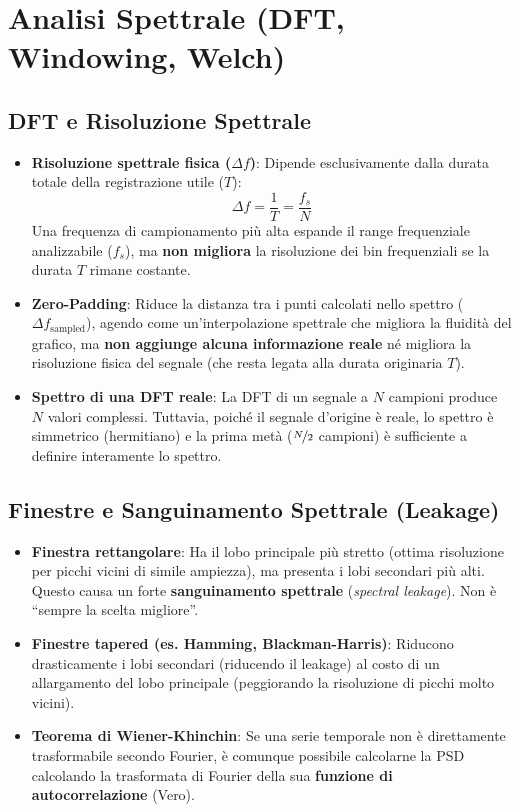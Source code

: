 \documentclass[10pt, letterpaper]{report}
\begin{document}
\chapter{Analisi Spettrale (DFT, Windowing, Welch)}

\section{DFT e Risoluzione Spettrale}
\begin{itemize}
    \item \textbf{Risoluzione spettrale fisica (\(\Delta f\))}: Dipende esclusivamente dalla durata totale della registrazione utile (\(T\)):
    \[
    \Delta f = \frac{1}{T} = \frac{f_s}{N}
    \]
    Una frequenza di campionamento più alta espande il range frequenziale analizzabile (\(f_s\)), ma \textbf{non migliora} la risoluzione dei bin frequenziali se la durata \(T\) rimane costante.
    \item \textbf{Zero-Padding}: Riduce la distanza tra i punti calcolati nello spettro (\(\Delta f_{\text{sampled}}\)), agendo come un'interpolazione spettrale che migliora la fluidità del grafico, ma \textbf{non aggiunge alcuna informazione reale} né migliora la risoluzione fisica del segnale (che resta legata alla durata originaria \(T\)).
    \item \textbf{Spettro di una DFT reale}: La DFT di un segnale a \(N\) campioni produce \(N\) valori complessi. Tuttavia, poiché il segnale d'origine è reale, lo spettro è simmetrico (hermitiano) e la prima metà (\(\nicefrac{N}{2}\) campioni) è sufficiente a definire interamente lo spettro.
\end{itemize}

\section{Finestre e Sanguinamento Spettrale (Leakage)}
\begin{itemize}
    \item \textbf{Finestra rettangolare}: Ha il lobo principale più stretto (ottima risoluzione per picchi vicini di simile ampiezza), ma presenta i lobi secondari più alti. Questo causa un forte \textbf{sanguinamento spettrale} (\emph{spectral leakage}). Non è ``sempre la scelta migliore''.
    \item \textbf{Finestre tapered (es. Hamming, Blackman-Harris)}: Riducono drasticamente i lobi secondari (riducendo il leakage) al costo di un allargamento del lobo principale (peggiorando la risoluzione di picchi molto vicini).
    \item \textbf{Teorema di Wiener-Khinchin}: Se una serie temporale non è direttamente trasformabile secondo Fourier, è comunque possibile calcolarne la PSD calcolando la trasformata di Fourier della sua \textbf{funzione di autocorrelazione} (Vero).
\end{itemize}
\end{document}
